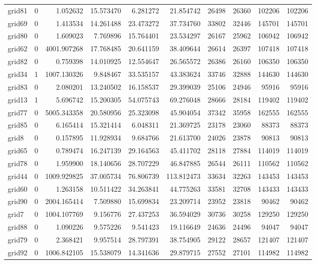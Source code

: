 \begin{longtable}{|l|r|r|r|r|r|r|r|r|r|}
grid81 & 0 & 1.052632 & 15.573470 & 6.281272 & 21.854742 & 26498 & 26360 & 102206 & 102206 \\
grid69 & 0 & 1.413534 & 14.261488 & 23.473272 & 37.734760 & 33802 & 32446 & 145701 & 145701 \\
grid80 & 0 & 1.609023 & 7.769896 & 15.764401 & 23.534297 & 26167 & 25962 & 106942 & 106942 \\
grid62 & 0 & 4001.907268 & 17.768485 & 20.641159 & 38.409644 & 26614 & 26397 & 107418 & 107418 \\
grid82 & 0 & 0.759398 & 14.010925 & 12.554647 & 26.565572 & 26386 & 26160 & 106350 & 106350 \\
grid34 & 1 & 1007.130326 & 9.848467 & 33.535157 & 43.383624 & 33746 & 32888 & 144630 & 144630 \\
grid83 & 0 & 2.080201 & 13.240502 & 16.158537 & 29.399039 & 25106 & 24946 & 95916 & 95916 \\
grid13 & 1 & 5.696742 & 15.200305 & 54.075743 & 69.276048 & 28666 & 28184 & 119402 & 119402 \\
grid77 & 0 & 5005.343358 & 20.580956 & 25.323098 & 45.904054 & 37342 & 35958 & 162555 & 162555 \\
grid85 & 0 & 6.165414 & 15.321414 & 6.048311 & 21.369725 & 23178 & 23060 & 88373 & 88373 \\
grid8 & 0 & 0.157895 & 11.928934 & 9.684766 & 21.613700 & 24026 & 23878 & 90813 & 90813 \\
grid65 & 0 & 0.789474 & 16.247139 & 29.164563 & 45.411702 & 28118 & 27884 & 114019 & 114019 \\
grid78 & 0 & 1.959900 & 18.140656 & 28.707229 & 46.847885 & 26544 & 26111 & 110562 & 110562 \\
grid44 & 0 & 1009.929825 & 37.005734 & 76.806739 & 113.812473 & 33634 & 32263 & 143453 & 143453 \\
grid60 & 0 & 1.263158 & 10.511422 & 34.263841 & 44.775263 & 33581 & 32708 & 143433 & 143433 \\
grid90 & 0 & 2004.165414 & 7.509880 & 15.699834 & 23.209714 & 23952 & 23818 & 90462 & 90462 \\
grid7 & 0 & 1004.107769 & 9.156776 & 27.437253 & 36.594029 & 30736 & 30258 & 129250 & 129250 \\
grid88 & 0 & 1.090226 & 9.575226 & 9.541423 & 19.116649 & 24636 & 24496 & 94047 & 94047 \\
grid79 & 0 & 2.368421 & 9.957514 & 28.797391 & 38.754905 & 29122 & 28657 & 121407 & 121407 \\
grid92 & 0 & 1006.842105 & 15.538079 & 14.341636 & 29.879715 & 27552 & 27101 & 114982 & 114982 \\

\end{longtable}
